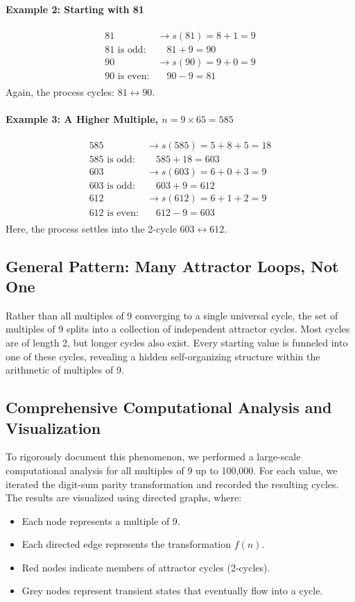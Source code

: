 \documentclass[12pt]{article}
\begin{document}
\paragraph{Example 2: Starting with 81}
\begin{align*}
81 &\to s(81) = 8+1 = 9 \\
81 \text{ is odd:} &\quad 81 + 9 = 90 \\
90 &\to s(90) = 9+0 = 9 \\
90 \text{ is even:} &\quad 90 - 9 = 81 \\
\end{align*}
Again, the process cycles: $81 \leftrightarrow 90$.

\paragraph{Example 3: A Higher Multiple, $n = 9 \times 65 = 585$}
\begin{align*}
585 &\to s(585) = 5+8+5 = 18 \\
585 \text{ is odd:} &\quad 585 + 18 = 603 \\
603 &\to s(603) = 6+0+3 = 9 \\
603 \text{ is odd:} &\quad 603 + 9 = 612 \\
612 &\to s(612) = 6+1+2 = 9 \\
612 \text{ is even:} &\quad 612 - 9 = 603 \\
\end{align*}
Here, the process settles into the 2-cycle $603 \leftrightarrow 612$.

\subsection{General Pattern: Many Attractor Loops, Not One}
Rather than all multiples of 9 converging to a single universal cycle, the set of multiples of 9 splits into a collection of independent attractor cycles. Most cycles are of length 2, but longer cycles also exist. Every starting value is funneled into one of these cycles, revealing a hidden self-organizing structure within the arithmetic of multiples of 9.

\subsection{Comprehensive Computational Analysis and Visualization}
To rigorously document this phenomenon, we performed a large-scale computational analysis for all multiples of 9 up to 100,000. For each value, we iterated the digit-sum parity transformation and recorded the resulting cycles. The results are visualized using directed graphs, where:
\begin{itemize}
    \item Each node represents a multiple of 9.
    \item Each directed edge represents the transformation $f(n)$.
    \item Red nodes indicate members of attractor cycles (2-cycles).
    \item Grey nodes represent transient states that eventually flow into a cycle.
\end{itemize}
\end{document}
